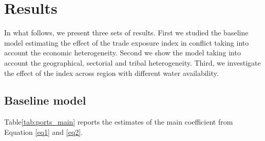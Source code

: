 \chapter{Results}
In what follows, we present three sets of results. First we studied the baseline model estimating the effect of the trade exposure index in conflict taking into account the economic heterogeneity. Second we show the model taking into account the geographical, sectorial and tribal heterogeneity. Third, we investigate the effect of the index across region with different water availability. \\

\section{Baseline model}
Table\ref{tab:ports_main} reports the estimates of the main coefficient from Equation \eqref{eq1} and \eqref{eq2}.
